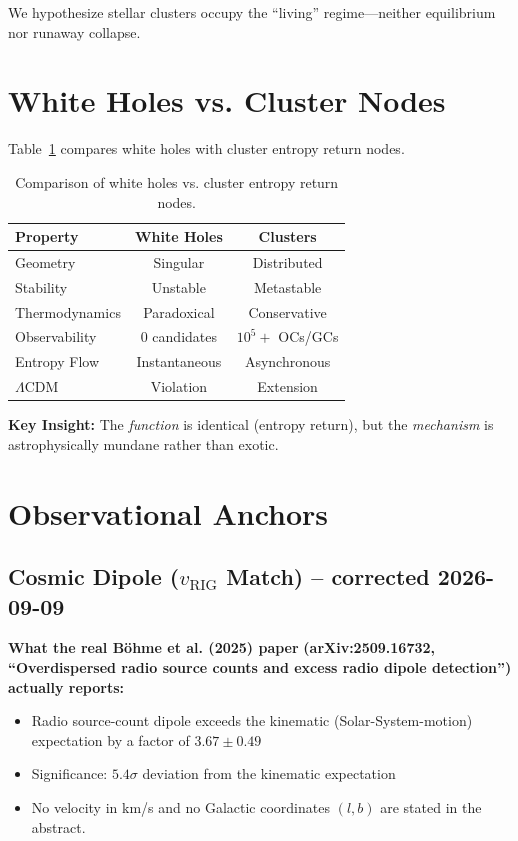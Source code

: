 \documentclass[11pt,a4paper,twocolumn]{article}
\begin{document}
We hypothesize stellar clusters occupy the ``living'' regime---neither equilibrium nor runaway collapse.

\section{White Holes vs. Cluster Nodes}

Table~\ref{tab:comparison} compares white holes with cluster entropy return nodes.

\begin{table}[h]
\centering
\small
\begin{tabular}{lcc}
\hline
\textbf{Property} & \textbf{White Holes} & \textbf{Clusters} \\
\hline
Geometry & Singular & Distributed \\
Stability & Unstable & Metastable \\
Thermodynamics & Paradoxical & Conservative \\
Observability & 0 candidates & $10^5+$ OCs/GCs \\
Entropy Flow & Instantaneous & Asynchronous \\
$\Lambda$CDM & Violation & Extension \\
\hline
\end{tabular}
\caption{Comparison of white holes vs. cluster entropy return nodes.}
\label{tab:comparison}
\end{table}

\textbf{Key Insight:} The \emph{function} is identical (entropy return), but the \emph{mechanism} is astrophysically mundane rather than exotic.

\section{Observational Anchors}

\subsection{Cosmic Dipole ($v_{\text{RIG}}$ Match) -- corrected 2026-09-09}

\textbf{What the real Böhme et al. (2025) paper} \citep{bohme2025} \textbf{(arXiv:2509.16732, ``Overdispersed radio source counts and excess radio dipole detection'') actually reports:}
\begin{itemize}
    \item Radio source-count dipole exceeds the kinematic (Solar-System-motion) expectation by a factor of $3.67 \pm 0.49$
    \item Significance: $5.4\sigma$ deviation from the kinematic expectation
    \item No velocity in km/s and no Galactic coordinates $(l,b)$ are stated in the abstract.
\end{itemize}
\end{document}
